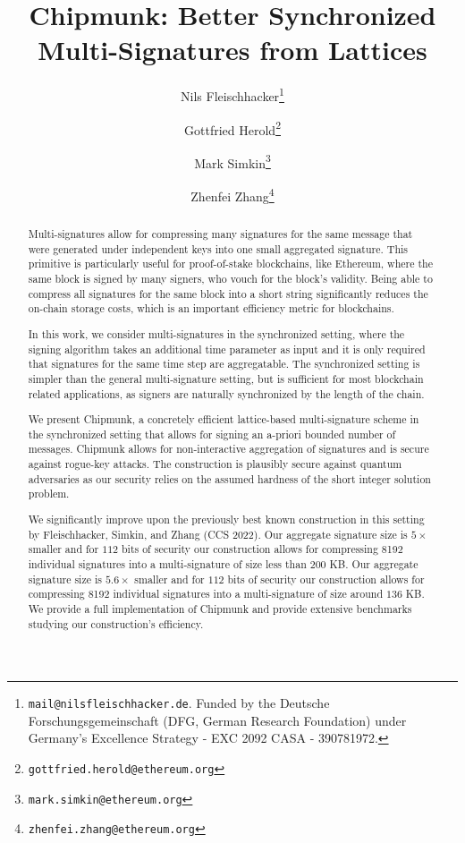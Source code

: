\documentclass[11pt]{llncs}
\title{Chipmunk: Better Synchronized Multi-Signatures from Lattices}
\author{
 	Nils Fleischhacker\inst{1}\thanks{\texttt{mail@nilsfleischhacker.de}. Funded by the Deutsche Forschungsgemeinschaft (DFG, German Research Foundation) under Germany's Excellence Strategy - EXC 2092 CASA - 390781972.}%
 	\and
 	Gottfried Herold\inst{2}\thanks{\texttt{gottfried.herold@ethereum.org}}%
 	\and
 	Mark Simkin\inst{2}\thanks{\texttt{mark.simkin@ethereum.org}}%
   \and
   Zhenfei Zhang\inst{2}\thanks{\texttt{zhenfei.zhang@ethereum.org}}%
}
\institute{
	 Ruhr University Bochum
	 \and
	 Ethereum Foundation
}
\newcommand\eprint[1]{{\color{purple}#1}}
\newcommand\cameraready[1]{{\color{orange}#1}}
\newcommand\cameraready[1]{#1}
\newcommand\eprint[1]\relax
\newcommand\eprint[1]{#1}
\newcommand\cameraready[1]\relax
\begin{document}
\pagestyle{plain}

\maketitle
\noindent
\makebox[\linewidth]{\small \today}

\begin{abstract}
Multi-signatures allow for compressing many signatures for the same message that were generated under independent keys into one small aggregated signature. 
This primitive is particularly useful for proof-of-stake blockchains, like Ethereum, where the same block is signed by many signers, who vouch for the block's validity.
Being able to compress all signatures for the same block into a short string significantly reduces the on-chain storage costs, which is an important efficiency metric for blockchains.

In this work, we consider multi-signatures in the synchronized setting, where the signing algorithm takes an additional time parameter as input and it is only required that signatures for the same time step are aggregatable.
The synchronized setting is simpler than the general multi-signature setting, but is sufficient for most blockchain related applications, as signers are naturally synchronized by the length of the chain.

We present Chipmunk, a concretely efficient lattice-based multi-signature scheme in the synchronized setting that allows for signing an a-priori bounded number of messages.
Chipmunk allows for non-interactive aggregation of signatures and is secure against rogue-key attacks.
The construction is plausibly secure against quantum adversaries as our security relies on the assumed hardness of the short integer solution problem.

We significantly improve upon the previously best known construction in this setting by Fleischhacker, Simkin, and Zhang (CCS 2022).
\cameraready{
Our aggregate signature size is $5 \times$ smaller and for $112$ bits of security our construction allows for compressing 8192 individual signatures into a multi-signature of size less than $200$ KB.}
\eprint{
Our aggregate signature size is $5.6 \times$ smaller and for $112$ bits of security our construction allows for compressing 8192 individual signatures into a multi-signature of size around $136$ KB.
}
We provide a full implementation of Chipmunk and provide extensive benchmarks studying our construction's efficiency.

\end{abstract}
\end{document}
